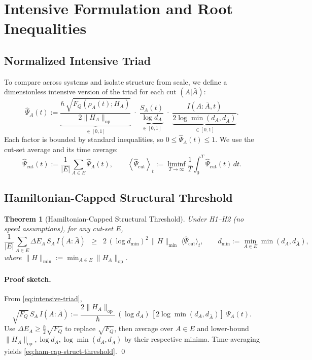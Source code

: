 \documentclass[10pt]{article}
\newtheorem{theorem}{Theorem}
\begin{document}
\section{Intensive Formulation and Root Inequalities}

\subsection{Normalized Intensive Triad}

To compare across systems and isolate structure from scale, we define a dimensionless intensive version
of the triad for each cut $(A|\bar{A})$:
\begin{equation}
\widehat{\Psi}_A(t)
:= \underbrace{\frac{\hbar\,\sqrt{F_Q(\rho_A(t);H_A)}}{2\|H_A\|_{\mathrm{op}}}}_{\in[0,1]}
\;\cdot\;
\underbrace{\frac{S_A(t)}{\log d_A}}_{\in[0,1]}
\;\cdot\;
\underbrace{\frac{I(A:\bar{A},t)}{2\log\min(d_A,d_{\bar{A}})}}_{\in[0,1]}.
\label{eq:intensive-triad}
\end{equation}
Each factor is bounded by standard inequalities, so $0\le \widehat{\Psi}_A(t)\le 1$.
We use the cut-set average and its time average:
\[
\widehat{\Psi}_{\mathrm{cut}}(t) := \frac{1}{|E|}\sum_{A\in E}\widehat{\Psi}_A(t),
\qquad
\left\langle \widehat{\Psi}_{\mathrm{cut}} \right\rangle_t
:= \liminf_{T\to\infty}\frac{1}{T}\int_0^T \widehat{\Psi}_{\mathrm{cut}}(t)\,dt.
\]

\subsection{Hamiltonian-Capped Structural Threshold}

\begin{theorem}[Hamiltonian-Capped Structural Threshold]
\label{thm:ham-cap}
Under H1–H2 (no speed assumptions), for any cut-set $E$,
\begin{equation}
\frac{1}{|E|}\sum_{A\in E} \Delta E_A\,S_A\,I(A:\bar{A})
\;\;\ge\;\;
2\,(\log d_{\min})^2\,\|H\|_{\min}\;
\Big\langle \widehat{\Psi}_{\mathrm{cut}} \Big\rangle_t,
\qquad
d_{\min}:=\min_{A\in E}\min(d_A,d_{\bar{A}}),
\label{eq:ham-cap-struct-threshold}
\end{equation}
where $\|H\|_{\min}:=\min_{A\in E}\|H_A\|_{\mathrm{op}}$.
\end{theorem}

\paragraph{Proof sketch.}
From \eqref{eq:intensive-triad},
\[
\sqrt{F_Q}\,S_A\,I(A:\bar{A})
:= \frac{2\|H_A\|_{\mathrm{op}}}{\hbar}\,(\log d_A)\,[2\log\min(d_A,d_{\bar{A}})]\;\widehat{\Psi}_A(t).
\]
Use $\Delta E_A\ge \frac{\hbar}{2}\sqrt{F_Q}$ to replace $\sqrt{F_Q}$, then average over $A\in E$ and
lower-bound $\|H_A\|_{\mathrm{op}}, \log d_A, \log\min(d_A,d_{\bar{A}})$ by their respective minima.
Time-averaging yields \eqref{eq:ham-cap-struct-threshold}. \qed
\end{document}
